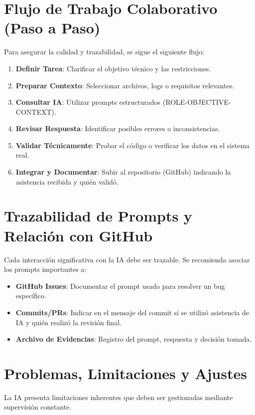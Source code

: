 \section{Flujo de Trabajo Colaborativo (Paso a Paso)}
Para asegurar la calidad y trazabilidad, se sigue el siguiente flujo:
\begin{enumerate}
    \item \textbf{Definir Tarea}: Clarificar el objetivo técnico y las restricciones.
    \item \textbf{Preparar Contexto}: Seleccionar archivos, logs o requisitos relevantes.
    \item \textbf{Consultar IA}: Utilizar prompts estructurados (ROLE-OBJECTIVE-CONTEXT).
    \item \textbf{Revisar Respuesta}: Identificar posibles errores o inconsistencias.
    \item \textbf{Validar Técnicamente}: Probar el código o verificar los datos en el sistema real.
    \item \textbf{Integrar y Documentar}: Subir al repositorio (GitHub) indicando la asistencia recibida y quién validó.
\end{enumerate}

\section{Trazabilidad de Prompts y Relación con GitHub}
Cada interacción significativa con la IA debe ser trazable. Se recomienda asociar los prompts importantes a:
\begin{itemize}
    \item \textbf{GitHub Issues}: Documentar el prompt usado para resolver un bug específico.
    \item \textbf{Commits/PRs}: Indicar en el mensaje del commit si se utilizó asistencia de IA y quién realizó la revisión final.
    \item \textbf{Archivo de Evidencias}: Registro del prompt, respuesta y decisión tomada.
\end{itemize}

\section{Problemas, Limitaciones y Ajustes}
La IA presenta limitaciones inherentes que deben ser gestionadas mediante supervisión constante.

